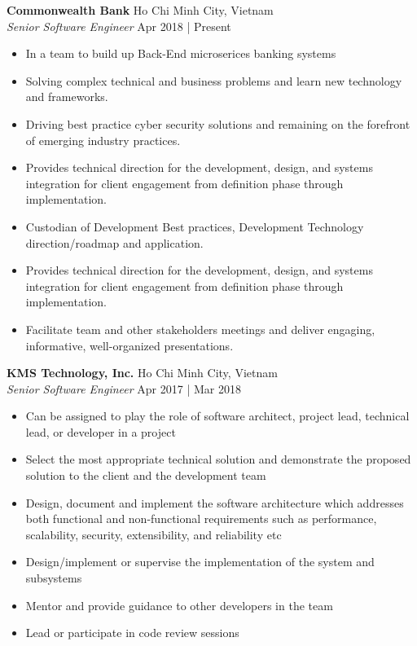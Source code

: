 \documentclass[a4paper]{article}
\begin{document}
\textbf{Commonwealth Bank} \hfill Ho Chi Minh City, Vietnam\\
\textit{Senior Software Engineer} \hfill Apr 2018 | Present\\
\vspace{-1mm}
\begin{itemize} \itemsep 1pt
	\item In a team to build up Back-End microserices banking systems
	\item Solving complex technical and business problems and learn new technology and frameworks.
	\item Driving best practice cyber security solutions and remaining on the forefront of emerging industry practices.
	\item Provides technical direction for the development, design, and systems integration for client engagement from definition phase through implementation.
	\item Custodian of Development Best practices, Development Technology direction/roadmap and application.
	\item Provides technical direction for the development, design, and systems integration for client engagement from definition phase through implementation.
	\item Facilitate team and other stakeholders meetings and deliver engaging, informative, well-organized presentations.
\end{itemize}
\textbf{KMS Technology, Inc.} \hfill Ho Chi Minh City, Vietnam\\
\textit{Senior Software Engineer} \hfill Apr 2017 | Mar 2018\\
\vspace{-1mm}
\begin{itemize} \itemsep 1pt
	\item Can be assigned to play the role of software architect, project lead, technical lead, or developer in a project
	\item Select the most appropriate technical solution and demonstrate the proposed solution to the client and the development team
	\item Design, document and implement the software architecture which addresses both functional and non-functional requirements such as performance, scalability, security, extensibility, and reliability etc
	\item Design/implement or supervise the implementation of the system and subsystems
	\item Mentor and provide guidance to other developers in the team
	\item Lead or participate in code review sessions
\end{itemize}
\end{document}
